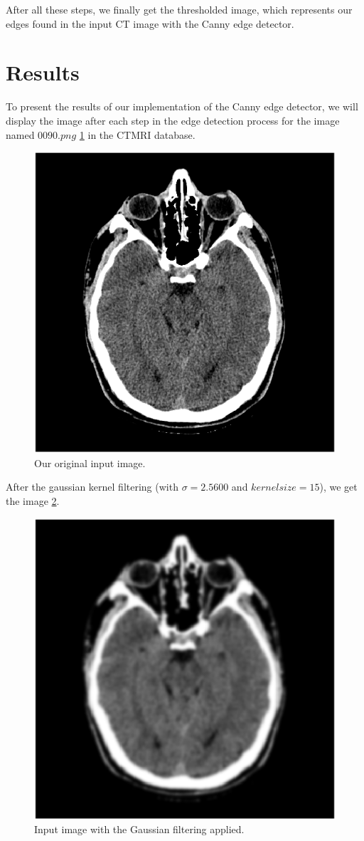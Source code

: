 \documentclass[9pt]{IEEEtran}
\begin{document}
After all these steps, we finally get the thresholded image, which represents our edges found in the input CT image with the Canny edge detector.

\section{Results}

To present the results of our implementation of the Canny edge detector, we will display the image after each step in the edge detection process for the image named $0090.png$ \ref{fig_5} in the CTMRI database.

\begin{figure}[!htb]
\centering
\includegraphics[width=0.8\columnwidth]{original_image.png}
\caption[c1]{ Our original input image. }
\label{fig_5}
\end{figure}

After the gaussian kernel filtering (with $\sigma = 2.5600$ and $kernelsize = 15$), we get the image  \ref{fig_6}.

\begin{figure}[!htb]
\centering
\includegraphics[width=0.8\columnwidth]{lp_filtered_image.png}
\caption[c1]{ Input image with the Gaussian filtering applied. }
\label{fig_6}
\end{figure}
\end{document}
